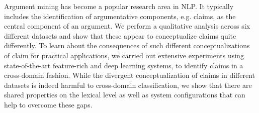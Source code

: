Argument mining has become a popular research area in NLP. It typically includes the identification of argumentative components, e.g. claims, as the central component of an argument. We perform a qualitative analysis across six different datasets and show that these appear to conceptualize claims quite differently. To learn about the consequences of such different conceptualizations of claim for practical applications, we carried out extensive experiments using state-of-the-art feature-rich and deep learning systems, to identify claims in a cross-domain fashion. While the divergent conceptualization of claims in different datasets is indeed harmful to cross-domain classification, we show that there are shared properties on the lexical level as well as system configurations that can help to overcome these gaps.
